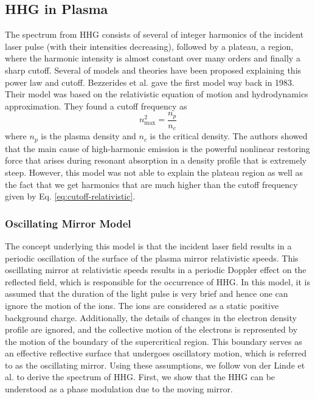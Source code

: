\subsection{HHG in Plasma}
The spectrum from HHG consists of several of integer harmonics of the incident laser pulse (with their intensities decreasing), followed by a plateau, a region, where the harmonic intensity is almost constant over many orders and finally a sharp cutoff. Several of models and theories have been proposed explaining this power law and cutoff. Bezzerides et al.\cite{hhg-relativistic} gave the first model way back in 1983. Their model was based on the relativistic equation of motion and hydrodynamics approximation. They found a cutoff frequency as
\begin{equation}
    \label{eq:cutoff-relativistic}
    n_{\max}^2 = \frac{n_p}{n_c}
\end{equation}
where $n_p$ is the plasma density and $n_c$ is the critical density. The authors showed that the main cause of high-harmonic emission is the powerful nonlinear restoring force that arises during resonant absorption in a density profile that is extremely steep. However, this model was not able to explain the plateau region as well as the fact that we get harmonics that are much higher than the cutoff frequency given by Eq. \ref{eq:cutoff-relativistic}.

\subsubsection{Oscillating Mirror Model}
The concept underlying this model is that the incident laser field results in a periodic oscillation of the surface of the plasma mirror relativistic speeds. This oscillating mirror at relativistic speeds results in a periodic Doppler effect on the reflected field, which is responsible for the occurrence of HHG. In this model, it is assumed that the duration of the light pulse is very brief and hence one can ignore the motion of the ions. The ions are considered as a static positive background charge. Additionally, the details of changes in the electron density profile are ignored, and the collective motion of the electrons is represented by the motion of the boundary of the supercritical region. This boundary serves as an effective reflective surface that undergoes oscillatory motion, which is referred to as the oscillating mirror. Using these assumptions, we follow von der Linde et al.\cite{hhg-main} to derive the spectrum of HHG. First, we show that the HHG can be understood as a phase modulation due to the moving mirror.


